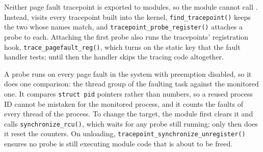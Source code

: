 Neither page fault tracepoint is exported to modules, so the module cannot
call . Instead,
 visits every tracepoint built into
the kernel, \texttt{find\_tracepoint()} keeps the two whose names match, and
\texttt{tracepoint\_probe\_register()} attaches a probe to each. Attaching the
first probe also runs the tracepoints' registration hook,
\texttt{trace\_pagefault\_reg()}, which turns on the static key that the fault
handler tests; until then the handler skips the tracing code altogether.

A probe runs on every page fault in the system with preemption disabled, so
it does one comparison: the thread group of the faulting task against the
monitored one. It compares \texttt{struct pid} pointers rather than numbers,
so a reused process ID cannot be mistaken for the monitored process, and it
counts the faults of every thread of the process. To change the target, the
module first clears it and calls \texttt{synchronize\_rcu()}, which waits for
any probe still running; only then does it reset the counters. On unloading,
\texttt{tracepoint\_synchronize\_unregister()} ensures no probe is still
executing module code that is about to be freed.
